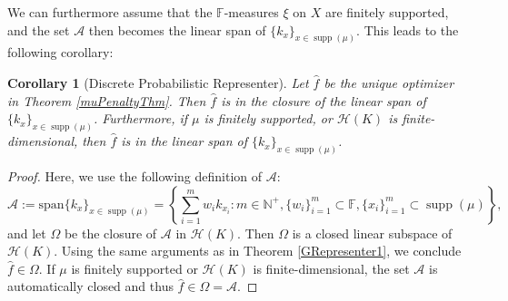 \documentclass{amsart}
\numberwithin{equation}{section}
\DeclareMathOperator{\supp}{supp}
\theoremstyle{plain}
\newtheorem{corollary}[subsection]{Corollary}
\theoremstyle{remark}
\theoremstyle{definition}
\begin{document}
We can furthermore assume that the $\mathbb{F}$-measures $\xi$ on $X$ are finitely supported, and the set $\mathscr{A}$ then becomes the linear span of $\{k_x\}_{x \in \supp(\mu)}$.
This leads to the following corollary:
\begin{corollary}[Discrete Probabilistic Representer]\label{GRepresenter2}
    Let $\hat{f}$ be the unique optimizer in Theorem \ref{muPenaltyThm}.
    Then $\hat{f}$ is in the closure of the linear span of $\{k_x\}_{x \in \supp(\mu)}$.
    Furthermore, if $\mu$ is finitely supported, or $\mathscr{H}(K)$ is finite-dimensional, 
 then $\hat{f}$ is in the linear span of $\{k_x\}_{x \in \supp(\mu)}$.
\end{corollary}

 \begin{proof}
Here, we use the following definition of $\mathscr{A}$:
     \begin{equation*}
        \mathscr{A}:= \text{span}{\{k_x\}_{x \in \supp(\mu)}} = \left\{\sum_{i=1}^m w_i k_{x_i}: m \in \mathbb{N}^{+},  \{w_i\}_{i=1}^m \subset \mathbb{F},  \{x_i\}_{i=1}^m \subset \supp(\mu) \right \},
    \end{equation*}
and let $\Omega$ be the closure of $\mathscr{A}$ in $\mathscr{H}(K)$.
Then $\Omega$ is a closed linear subspace of $ \mathscr{H}(K)$. 
Using the same arguments as in Theorem \ref{GRepresenter1}, we conclude $\hat{f} \in \Omega$.
If $\mu$ is finitely supported or $\mathscr{H}(K)$ is finite-dimensional, the set $\mathscr{A}$ is automatically closed and thus $\hat{f} \in \Omega = \mathscr{A}$.
\end{proof}
\end{document}
